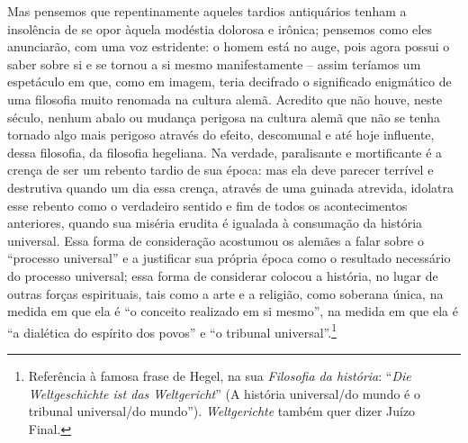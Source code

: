 Mas pensemos que repentinamente aqueles tardios antiquários tenham a
insolência de se opor àquela modéstia dolorosa e irônica; pensemos como
eles anunciarão, com uma voz estridente: o homem está no auge, pois
agora possui o saber sobre si e se tornou a si mesmo manifestamente --
assim teríamos um espetáculo em que, como em imagem, teria decifrado o
significado enigmático de uma filosofia muito renomada na cultura alemã.
Acredito que não houve, neste século, nenhum abalo ou mudança perigosa
na cultura alemã que não se tenha tornado algo mais perigoso através do
efeito, descomunal e até hoje influente, dessa filosofia, da filosofia
hegeliana. Na verdade, paralisante e mortificante é a crença de ser um
rebento tardio de sua época: mas ela deve parecer terrível e destrutiva
quando um dia essa crença, através de uma guinada atrevida, idolatra
esse rebento como o verdadeiro sentido e fim de todos os acontecimentos
anteriores, quando sua miséria erudita é igualada à consumação da
história universal. Essa forma de consideração acostumou os alemães a
falar sobre o ``processo universal'' e a justificar sua própria época
como o resultado necessário do processo universal; essa forma de
considerar colocou a história, no lugar de outras forças espirituais,
tais como a arte e a religião, como soberana única, na medida em que ela
é ``o conceito realizado em si mesmo'', na medida em que ela é ``a
dialética do espírito dos povos'' e ``o tribunal universal''.\footnote{Referência
  à famosa frase de Hegel, na sua \emph{Filosofia da história}:
  ``\emph{Die Weltgeschichte ist das Weltgericht}'' (A história
  universal/do mundo é o tribunal universal/do mundo'').
  \emph{Weltgerichte} também quer dizer Juízo Final.}

